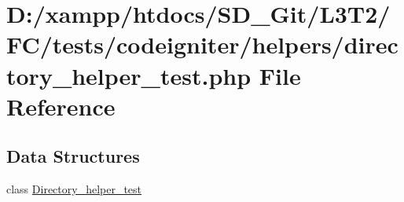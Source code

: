 \hypertarget{tests_2codeigniter_2helpers_2directory__helper__test_8php}{}\section{D\+:/xampp/htdocs/\+S\+D\+\_\+\+Git/\+L3\+T2/\+F\+C/tests/codeigniter/helpers/directory\+\_\+helper\+\_\+test.php File Reference}
\label{tests_2codeigniter_2helpers_2directory__helper__test_8php}
\subsection*{Data Structures}
\begin{DoxyCompactItemize}
\item 
class \hyperlink{class_directory__helper__test}{Directory\+\_\+helper\+\_\+test}
\end{DoxyCompactItemize}
